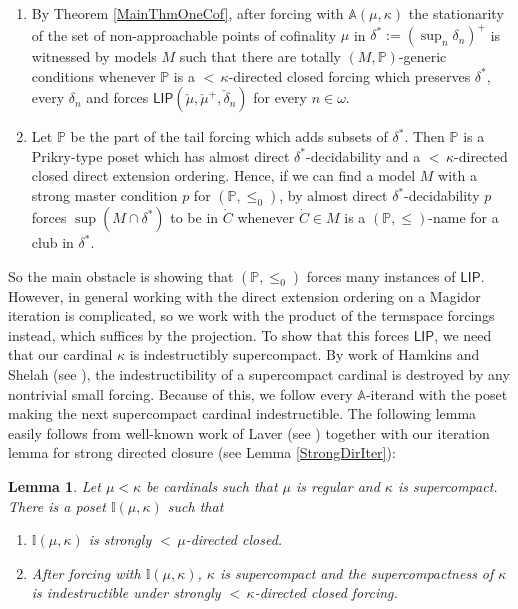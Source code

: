 \documentclass[a4paper]{amsart}
\theoremstyle{definition}
\theoremstyle{remark}
\theoremstyle{plain}
\newtheorem{mylem}[mydef]{Lemma}
\numberwithin{mydef}{section}
\newcommand{\dA}{\mathbb{A}}
\newcommand{\dI}{\mathbb{I}}
\newcommand{\dP}{\mathbb{P}}
\newcommand{\LIP}{\mathsf{LIP}}
\begin{document}
	\begin{enumerate}
		\item By Theorem \ref{MainThmOneCof}, after forcing with $\dA(\mu,\kappa)$ the stationarity of the set of non-approachable points of cofinality $\mu$ in $\delta^*:=(\sup_n\delta_n)^+$ is witnessed by models $M$ such that there are totally $(M,\dP)$-generic conditions whenever $\dP$ is a ${<}\,\kappa$-directed closed forcing which preserves $\delta^*$, every $\delta_n$ and forces $\LIP(\check{\mu},\check{\mu}^+,\check{\delta}_n)$ for every $n\in\omega$.
		\item Let $\dP$ be the part of the tail forcing which adds subsets of $\delta^*$. Then $\dP$ is a Prikry-type poset which has almost direct $\delta^*$-decidability and a ${<}\,\kappa$-directed closed direct extension ordering. Hence, if we can find a model $M$ with a strong master condition $p$ for $(\dP,\leq_0)$, by almost direct $\delta^*$-decidability $p$ forces $\sup(M\cap\delta^*)$ to be in $\dot{C}$ whenever $\dot{C}\in M$ is a $(\dP,\leq)$-name for a club in $\delta^*$.
	\end{enumerate}
	
	So the main obstacle is showing that $(\dP,\leq_0)$ forces many instances of $\LIP$. However, in general working with the direct extension ordering on a Magidor iteration is complicated, so we work with the product of the termspace forcings instead, which suffices by the projection. To show that this forces $\LIP$, we need that our cardinal $\kappa$ is indestructibly supercompact. By work of Hamkins and Shelah (see \cite{HamkinsShelahSuperdestructibility}), the indestructibility of a supercompact cardinal is destroyed by any nontrivial small forcing. Because of this, we follow every $\dA$-iterand with the poset making the next supercompact cardinal indestructible. The following lemma easily follows from well-known work of Laver (see \cite{LaverIndestruct}) together with our iteration lemma for strong directed closure (see Lemma \ref{StrongDirIter}):
	
	\begin{mylem}
		Let $\mu<\kappa$ be cardinals such that $\mu$ is regular and $\kappa$ is supercompact. There is a poset $\dI(\mu,\kappa)$ such that
		\begin{enumerate}
			\item $\dI(\mu,\kappa)$ is strongly ${<}\,\mu$-directed closed.
			\item After forcing with $\dI(\mu,\kappa)$, $\kappa$ is supercompact and the supercompactness of $\kappa$ is indestructible under strongly ${<}\,\kappa$-directed closed forcing.
		\end{enumerate}
	\end{mylem}
	
\end{document}
